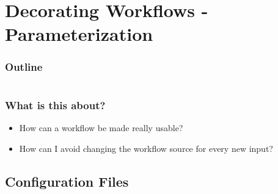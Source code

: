 \section{Decorating Workflows - Parameterization}

\begin{frame}
    \frametitle{Outline}
    \begin{columns}[t]
        \begin{column}{.5\textwidth}
            \tableofcontents[sections={1-9},currentsection]
        \end{column}
        \begin{column}{.5\textwidth}
            \tableofcontents[sections={10-18},currentsection]
        \end{column}
    \end{columns}
\end{frame}

\begin{frame}
  \frametitle{What is this about?}
   \begin{question}[Questions]
   	  \begin{itemize}
         \item How can a workflow be made really usable?
         \item How can I avoid changing the workflow source for every new input?
      \end{itemize}
   \end{question}
\end{frame}

\subsection{Configuration Files}


